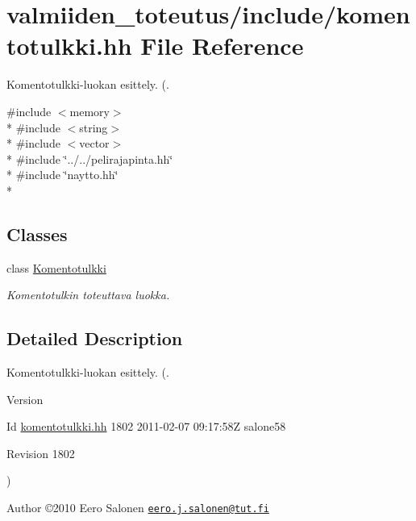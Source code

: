 \hypertarget{komentotulkki_8hh}{}\section{valmiiden\+\_\+toteutus/include/komentotulkki.hh File Reference}
\label{komentotulkki_8hh}


Komentotulkki-\/luokan esittely. (.  


{\ttfamily \#include $<$memory$>$}\\*
{\ttfamily \#include $<$string$>$}\\*
{\ttfamily \#include $<$vector$>$}\\*
{\ttfamily \#include \char`\"{}../../pelirajapinta.\+hh\char`\"{}}\\*
{\ttfamily \#include \char`\"{}naytto.\+hh\char`\"{}}\\*
\subsection*{Classes}
\begin{DoxyCompactItemize}
\item 
class \hyperlink{class_komentotulkki}{Komentotulkki}
\begin{DoxyCompactList}\small\item\em Komentotulkin toteuttava luokka. \end{DoxyCompactList}\end{DoxyCompactItemize}


\subsection{Detailed Description}
Komentotulkki-\/luokan esittely. (. 

\begin{DoxyVersion}{Version}

\end{DoxyVersion}
\begin{DoxyParagraph}{Id}
\hyperlink{komentotulkki_8hh}{komentotulkki.\+hh} 1802 2011-\/02-\/07 09\+:17\+:58\+Z salone58 
\end{DoxyParagraph}


\begin{DoxyParagraph}{Revision}
1802 
\end{DoxyParagraph}
) \begin{DoxyAuthor}{Author}
©2010 Eero Salonen \href{mailto:eero.j.salonen@tut.fi}{\tt eero.\+j.\+salonen@tut.\+fi} 
\end{DoxyAuthor}
